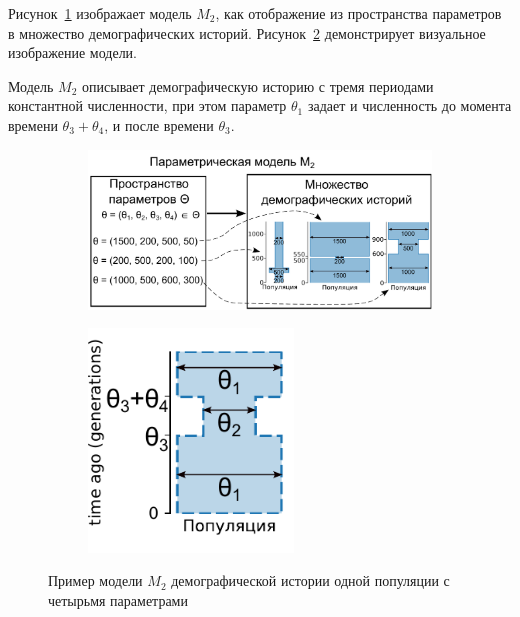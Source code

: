 Рисунок~\ref{fig:model_def2_1} изображает модель $M_2$, как отображение из пространства параметров в множество
демографических историй.
Рисунок~\ref{fig:model_def2_2} демонстрирует визуальное изображение модели.

Модель $M_2$ описывает демографическую историю с тремя периодами константной численности, при этом параметр $\theta_1$ задает и численность до момента времени $\theta_3 + \theta_4$, и после времени $\theta_3$.

\begin{figure}[ht]
    \centering
    \begin{subfigure}[b]{.59\textwidth}
    \includegraphics[width=\textwidth]{images_2/model_def_2.pdf}
    \caption{}
    \label{fig:model_def2_1}
    \end{subfigure}%
    \begin{subfigure}[b]{.40\textwidth}
    \centering
    \includegraphics[width=0.6\textwidth]{images_2/model_pict_2.pdf}
    \caption{}
    \label{fig:model_def2_2}
    \end{subfigure}
    \caption{Пример модели $M_2$ демографической истории одной популяции с четырьмя параметрами}
    \label{fig:model_def2}
\end{figure}

